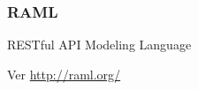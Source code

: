 \subsubsection{RAML}
\label{soa:tecnologias:raml}

RESTful API Modeling Language

Ver \url{http://raml.org/}
